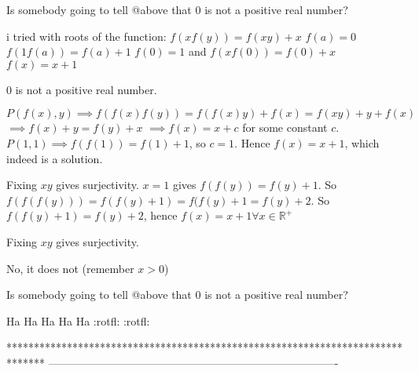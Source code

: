 \begin{solution}
	Is somebody going to tell @above that $0$ is not a positive real number?
\end{solution}



\begin{solution}
	\begin{tcolorbox}i tried with roots of the function:
$f(xf(y))=f(xy)+x$
$f(a)=0$
$f(1f(a))=f(a)+1$
$f(0)=1$
and $f(xf(0))=f(0)+x$
$f(x)=x+1$\end{tcolorbox}

$0$ is not a positive real number.


\end{solution}



\begin{solution}
	$P(f(x),y)\implies f(f(x)f(y))=f(f(x)y)+f(x)=f(xy)+y+f(x)$
$\implies f(x)+y=f(y)+x$
$\implies f(x)=x+c$ for some constant $c$.
$P(1,1)\implies f(f(1))=f(1)+1$, so $c=1$.
Hence $\boxed{f(x)=x+1}$, which indeed is a solution.

\end{solution}



\begin{solution}
	Fixing $xy$ gives surjectivity.
$x=1$ gives $f(f(y))=f(y)+1$. 
So $f(f(f(y)))=f(f(y)+1)=f(f(y)+1=f(y)+2$. So $f(f(y)+1)=f(y)+2$, hence $f(x)=x+1 \forall x \in \mathbb{R^+}$
\end{solution}



\begin{solution}
	\begin{tcolorbox}Fixing $xy$ gives surjectivity.\end{tcolorbox}
No, it does not (remember $x>0$)



\end{solution}



\begin{solution}
	\begin{tcolorbox}Is somebody going to tell @above that $0$ is not a positive real number?\end{tcolorbox}

Ha Ha Ha Ha Ha :rotfl:  :rotfl: 
\end{solution}
*******************************************************************************
-------------------------------------------------------------------------------

